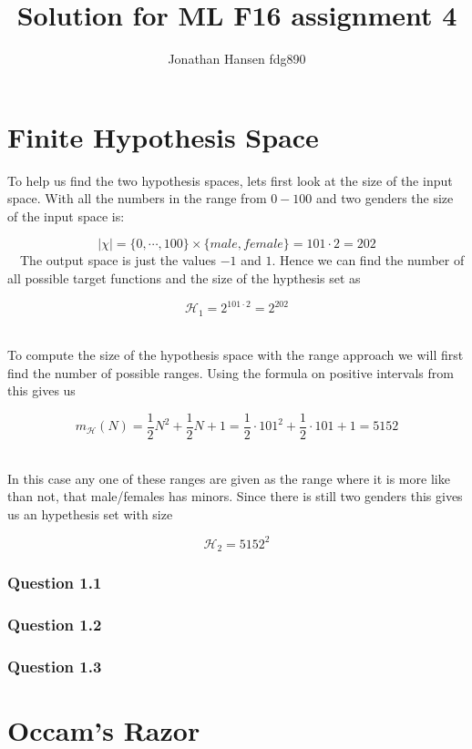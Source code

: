 \documentclass{article}
\begin{document}
\title{Solution for ML F16 assignment 4}
\author{Jonathan Hansen fdg890}
\maketitle

\section{Finite Hypothesis Space}
To help us find the two hypothesis spaces, lets first look at the size of the
input space. With all the numbers in the range from \(0-100\) and two genders
the size of the input space is:

\[
\left\vert\chi\right\vert = \{0,\cdots,100\} \times \{male,female\} = 101 \cdot 2 = 202
\]
\
\
The output space is just the values \(-1\) and \(1\). Hence we can find the
number of all possible target functions and the size of the hypthesis set as

\[
\mathcal{H}_1 = 2^{101 \cdot 2} = 2^{202}
\]
\
\

To compute the size of the hypothesis space with the range approach we will
first find the number of possible ranges. Using the formula on positive
intervals from \cite{abu2012learning} this gives us

\[
m_{\mathcal{H}}(N)= \dfrac{1}{2}N^2 + \dfrac{1}{2}N + 1 = \dfrac{1}{2}\cdot 101^2
+ \dfrac{1}{2} \cdot 101 + 1 = 5152
\]
\
\

In this case any one of these ranges are given as the range where it is more
like than not, that male/females has minors. Since there is still two genders
this gives us an hypethesis set with size

\[
\mathcal{H}_2 = 5152^2
\]


\subsubsection*{Question 1.1}

\subsubsection*{Question 1.2}

\subsubsection*{Question 1.3}


\section{Occam's Razor}
\end{document}
